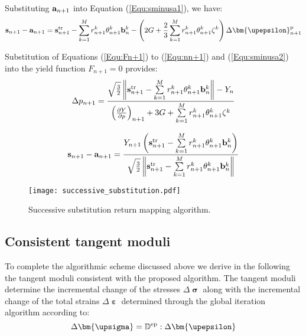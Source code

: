 Substituting ${{\bf{a}}_{n + 1}}$ into Equation (\ref{Equ:sminusa1}), we have:
\begin{equation}
\label{Equ:sminusa2}
\begin{aligned}
{{{\bf{s}}_{n + 1}} - {{\bf{a}}_{n + 1}}}=
{\bf{s}}_{n + 1}^{\rm{tr}} - \sum\limits_{k = 1}^M {r_{n + 1}^k\theta _{n + 1}^k{\bf{b}}_n^k}
- \left( {2G + \frac{2}{3}\sum\limits_{k = 1}^M {r_{n + 1}^k\theta _{n + 1}^k{\zeta ^k}} } \right)\Delta {\bm{\upepsilon }}_{n + 1}^{\rm{p}}
\end{aligned}
\end{equation}

Substitution of Equations (\ref{Equ:Fn+1}) to (\ref{Equ:nn+1}) and (\ref{Equ:sminusa2}) into the yield function ${F_{n + 1}} = 0$ provides:
\begin{equation}
\Delta {p_{n + 1}} = \frac{{\sqrt {\frac{3}{2}} \left\| {{\bf{s}}_{n + 1}^{\rm{tr}} - \sum\limits_{k = 1}^M {r_{n + 1}^k\theta _{n + 1}^k{\bf{b}}_n^k} } \right\| - {Y_n}}}{{{{\left( {\frac{{\partial Y}}{{\partial p}}} \right)}_{n + 1}} + 3G + \sum\limits_{k = 1}^M {r_{n + 1}^k\theta _{n + 1}^k{\zeta ^k}} }}
\end{equation}

\begin{equation}
{{\bf{s}}_{n + 1}} - {{\bf{a}}_{n + 1}} = \frac{{{Y_{n + 1}}\left( {{\bf{s}}_{n + 1}^{\rm{tr}} - \sum\limits_{k = 1}^M {r_{n + 1}^k\theta _{n + 1}^k{\bf{b}}_n^k} } \right)}}{{\sqrt {\frac{3}{2}} \left\| {{\bf{s}}_{n + 1}^{\rm{tr}} - \sum\limits_{k = 1}^M {r_{n + 1}^k\theta _{n + 1}^k{\bf{b}}_n^k} } \right\|}}
\end{equation}

\begin{figure}[ht]
	\centering
	\texttt{[image: successive\_substitution.pdf]}
	\caption{Successive substitution return mapping algorithm.}
	\label{Fig:radial_return_map}
\end{figure}

\subsection{Consistent tangent moduli}
\noindent
To complete the algorithmic scheme discussed above we derive in the following the tangent moduli consistent with the proposed algorithm. The tangent moduli determine the incremental change of the stresses $\Delta {\bm{\upsigma }}$ along with the incremental change of the total strains $\Delta {\bm{\upepsilon }}$ determined through the global iteration algorithm according to:
\begin{equation}
\Delta {\bm{\upsigma }} = {\mathbb{D}^{\rm{ep}}}:\Delta {\bm{\upepsilon }}
\end{equation}

